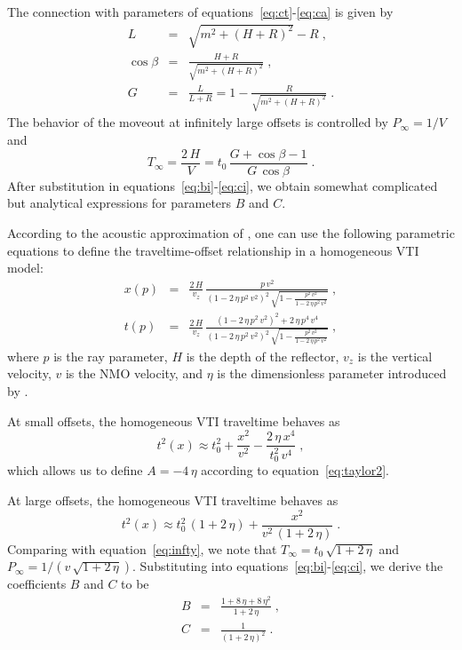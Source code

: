 The connection with parameters of equations~\ref{eq:ct}-\ref{eq:ca} is given by
\begin{eqnarray}
\label{eq:l}
L & = & \sqrt{m^2 + (H+R)^2} - R\;,   \\
\label{eq:cbeta}
\cos{\beta} & = & \frac{H+R}{\sqrt{m^2 + (H+R)^2}}\;, \\
\label{eq:g}
G & = & \frac{L}{L+R} = 1 - \frac{R}{\sqrt{m^2 + (H+R)^2}}\;.
\end{eqnarray}
The behavior of the moveout at infinitely large offsets is controlled by $P_{\infty} = 1/V$ and
\begin{equation}
\label{eq:ctinf3}
T_{\infty} = \frac{2\,H}{V} = t_0\,\frac{G+\cos{\beta} - 1}{G\,\cos{\beta}}\;. 
\end{equation}
After substitution in equations~\ref{eq:bi}-\ref{eq:ci}, we obtain
somewhat complicated but analytical expressions for parameters $B$ and
$C$.


According to the acoustic approximation of
\cite{GEO63-02-06230631}, one can use the following parametric
equations to define the traveltime-offset relationship in a
homogeneous VTI model:
\begin{eqnarray}
\label{eq:xpvti}
x(p) & = & \frac{2\,H}{v_z}\,\frac{p\,v^2}{(1-2\,\eta\,p^2\,v^2)^2\,\sqrt{1-\frac{p^2\,v^2}{1-2\,\eta\,p^2\,v^2}}}\;, \\
\label{eq:tpvti}
t(p) & = & \frac{2\,H}{v_z}\,\frac{(1-2\,\eta\,p^2\,v^2)^2 + 2\,\eta\,p^4\,v^4}
{(1-2\,\eta\,p^2\,v^2)^2\,\sqrt{1-\frac{p^2\,v^2}{1-2\,\eta\,p^2\,v^2}}}\;,
\end{eqnarray}
where $p$ is the ray parameter, $H$ is the depth of the reflector,
$v_z$ is the vertical velocity, $v$ is the NMO velocity, and $\eta$ is
the dimensionless parameter introduced by \cite{GEO60-05-15501566}.

At small offsets, the homogeneous VTI traveltime behaves as
\begin{equation}
\label{eq:vtismall}
t^2(x) \approx t_0^2 + \frac{x^2}{v^2} - \frac{2\,\eta\,x^4}{t_0^2\,v^4}\;,
\end{equation} 
which allows us to define $A=-4\,\eta$ according to equation~\ref{eq:taylor2}.

At large offsets, the homogeneous VTI traveltime behaves as
\begin{equation}
\label{eq:vtilarge}
t^2(x) \approx t_0^2\,(1+2\,\eta) + \frac{x^2}{v^2\,(1+2\,\eta)}\;.
\end{equation} 
Comparing with equation~\ref{eq:infty}, we note that $T_{\infty} =
t_0\,\sqrt{1+2\,\eta}$ and $P_{\infty} =
1/(v\,\sqrt{1+2\,\eta})$. Substituting into
equations~\ref{eq:bi}-\ref{eq:ci}, we derive the coefficients $B$ and
$C$ to be
\begin{eqnarray}
\label{eq:bvti}
B & = & \frac{1 + 8\,\eta + 8\,\eta^2}{1 + 2\,\eta}\;, \\
\label{eq:cvti}
C & = & \frac{1}{(1 + 2\,\eta)^2}\;.
\end{eqnarray}

\nocite{Sword.sep.51.313}




